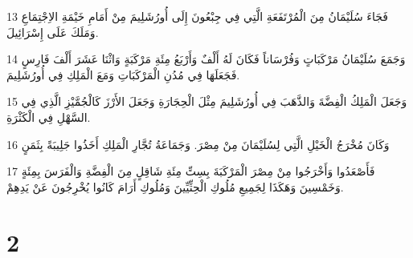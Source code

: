 \par 13 فَجَاءَ سُلَيْمَانُ مِنَ الْمُرْتَفَعَةِ الَّتِي فِي جِبْعُونَ إِلَى أُورُشَلِيمَ مِنْ أَمَامِ خَيْمَةِ الاِجْتِمَاعِ وَمَلَكَ عَلَى إِسْرَائِيلَ.
\par 14 وَجَمَعَ سُلَيْمَانُ مَرْكَبَاتٍ وَفُرْسَاناً فَكَانَ لَهُ أَلْفٌ وَأَرْبَعُ مِئَةِ مَرْكَبَةٍ وَاثْنَا عَشَرَ أَلْفَ فَارِسٍ فَجَعَلَهَا فِي مُدُنِ الْمَرْكَبَاتِ وَمَعَ الْمَلِكِ فِي أُورُشَلِيمَ.
\par 15 وَجَعَلَ الْمَلِكُ الْفِضَّةَ وَالذَّهَبَ فِي أُورُشَلِيمَ مِثْلَ الْحِجَارَةِ وَجَعَلَ الأَرْزَ كَالْجُمَّيْزِ الَّذِي فِي السَّهْلِ فِي الْكَثْرَةِ.
\par 16 وَكَانَ مُخْرَجُ الْخَيْلِ الَّتِي لِسُلَيْمَانَ مِنْ مِصْرَ. وَجَمَاعَةُ تُجَّارِ الْمَلِكِ أَخَذُوا جَلِيبَةً بِثَمَنٍ
\par 17 فَأَصْعَدُوا وَأَخْرَجُوا مِنْ مِصْرَ الْمَرْكَبَةَ بِسِتِّ مِئَةِ شَاقِلٍ مِنَ الْفِضَّةِ وَالْفَرَسَ بِمِئَةٍ وَخَمْسِينَ وَهَكَذَا لِجَمِيعِ مُلُوكِ الْحِثِّيِّينَ وَمُلُوكِ أَرَامَ كَانُوا يُخْرِجُونَ عَنْ يَدِهِمْ.

\chapter{2}


